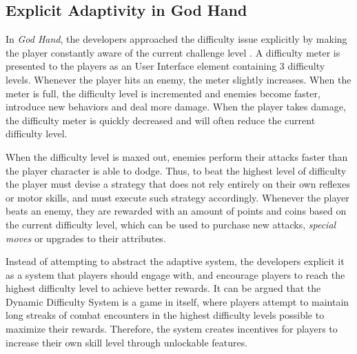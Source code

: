 \subsection{Explicit Adaptivity in God Hand}



In \emph{God Hand}, the developers approached the difficulty issue explicitly by making the player constantly aware of the current challenge level \cite{article_subjectivedifficulty}. A difficulty meter is presented to the players as an User Interface element containing 3 difficulty levels. Whenever the player hits an enemy, the meter slightly increases. When the meter is full, the difficulty level is incremented and enemies become faster, introduce new behaviors and deal more damage. When the player takes damage, the difficulty meter is quickly decreased and will often reduce the current difficulty level.

When the difficulty level is maxed out, enemies perform their attacks faster than the player character is able to dodge. Thus, to beat the highest level of difficulty the player must devise a strategy that does not rely entirely on their own reflexes or motor skills, and must execute such strategy accordingly. Whenever the player beats an enemy, they are rewarded with an amount of points and coins based on the current difficulty level, which can be used to purchase new attacks, \emph{special moves} or upgrades to their attributes.



Instead of attempting to abstract the adaptive system, the developers explicit it as a system that players should engage with, and encourage players to reach the highest difficulty level to achieve better rewards. It can be argued that the Dynamic Difficulty System is a game in itself, where players attempt to maintain long streaks of combat encounters in the highest difficulty levels possible to maximize their rewards. Therefore, the system creates incentives for players to increase their own skill level through unlockable features.

